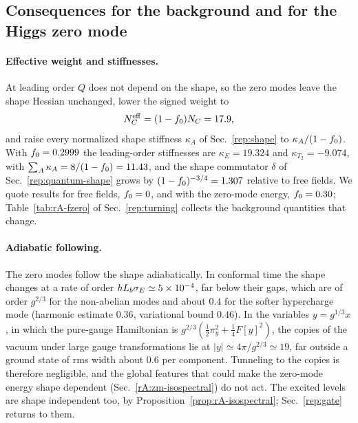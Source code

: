 \subsection{Consequences for the background and for the Higgs zero mode}
\label{rA:zm-consequences}

\paragraph{Effective weight and stiffnesses.}
At leading order $Q$ does not depend on the shape, so the zero modes leave the shape Hessian unchanged, lower the signed weight to
\begin{equation}
\rANeff=(1-\fzm)\NC=17.9 , %
\end{equation}
and raise every normalized shape stiffness $\kappa_A$ of Sec.~\ref{rep:shape} to $\kappa_A/(1-f_0)$.
With $f_0=0.2999$ the leading-order stiffnesses are $\kappa_E=19.324$ and $\kappa_{T_2}=-9.074$, with $\sum_A\kappa_A=8/(1-f_0)=11.43$, and the shape commutator $\delta$ of Sec.~\ref{rep:quantum-shape} grows by $(1-f_0)^{-3/4}=1.307$ relative to free fields. %
We quote results for free fields, $f_0=0$, and with the zero-mode energy, $f_0=0.30$; Table~\ref{tab:rA-fzero} of Sec.~\ref{rep:turning} collects the background quantities that change. %

\paragraph{Adiabatic following.}
The zero modes follow the shape adiabatically.
In conformal time the shape changes at a rate of order $hL_b\sigma_E\simeq5\times10^{-4}$, far below their gaps, which are of order $g^{2/3}$ for the non-abelian modes and about $0.4$ for the softer hypercharge mode (harmonic estimate $0.36$, variational bound $0.46$). %
In the variables $y=g^{1/3}x$, in which the pure-gauge Hamiltonian is $g^{2/3}(\tfrac12\pi_y^2+\tfrac14F[y]^2)$, the copies of the vacuum under large gauge transformations lie at $|y|\simeq4\pi/g^{2/3}\simeq19$, far outside a ground state of rms width about $0.6$ per component. %
Tunneling to the copies is therefore negligible, and the global features that could make the zero-mode energy shape dependent (Sec.~\ref{rA:zm-isospectral}) do not act.
The excited levels are shape independent too, by Proposition~\ref{prop:rA-isospectral}; Sec.~\ref{rep:gate} returns to them.

